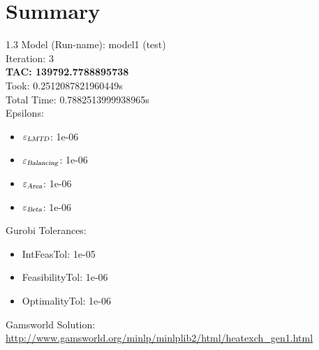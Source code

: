 \documentclass{article}%
\begin{document}
%
\normalsize%
\section{Summary}%
\thispagestyle{plain}%
\begin{spacing}{1.3}%
\Large%
Model (Run-name): model1 (test)\\%
Iteration: 3\\%
\textbf{TAC: 139792.7788895738}\\%
Took: 0.2512087821960449s\\%
Total Time: 0.7882513999938965s\\%
Epsilons:%
\begin{itemize}%
	\item $\varepsilon_{\textsl{LMTD}}$: 1e-06%
	\item $\varepsilon_{\textsl{Balancing}}$: 1e-06%
	\item $\varepsilon_{\textsl{Area}}$: 1e-06%
	\item $\varepsilon_{\textsl{Beta}}$: 1e-06%
\end{itemize}%
Gurobi Tolerances:%
\begin{itemize}%
	\item IntFeasTol: 1e-05%
	\item FeasibilityTol: 1e-06%
	\item OptimalityTol: 1e-06%
\end{itemize}%
\end{spacing}%
\normalsize%
Gamsworld Solution: \url{http://www.gamsworld.org/minlp/minlplib2/html/heatexch_gen1.html}%
%
\clearpage%
\end{document}

